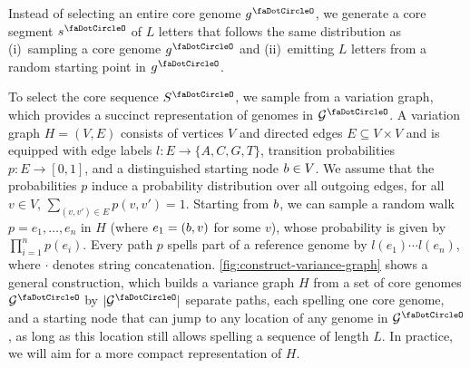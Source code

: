 Instead of selecting an entire core genome $\genome^\gcore$, we generate a core segment $\segment^\gcore$ of $L$ letters that follows the same distribution as (i)~sampling a core genome $\genome^\gcore$ and (ii)~emitting $L$ letters from a random starting point in $\genome^\gcore$.

To select the core sequence $\seq^\gcore$, we sample from a variation graph, which provides a succinct representation of genomes in $\genomes^\gcore$.
A variation graph $H=(V,E)$ consists of vertices $V$ and directed edges $E \subseteq V \times V$ and is equipped with edge labels $l \colon E \to \{A,C,G,T\}$, transition probabilities $p \colon E \to [0,1]$, and a distinguished starting node $b \in V$.
%
We assume that the probabilities $p$ induce a probability distribution over all outgoing edges, \ie for all $v \in V$, $\sum_{(v,v') \in E} p(v,v')=1$.
Starting from $b$, we can sample a random walk $p=e_1,\dots,e_n$ in $H$ (where $e_1=(b,v)$ for some $v$), whose probability is given by $\prod_{i=1}^{n} p(e_i)$.
Every path $p$ spells part of a reference genome by $l(e_1) \cdots l(e_n)$, where $\cdot$ denotes string concatenation.
%
\cref{fig:construct-variance-graph} shows a general construction, which builds a variance graph $H$ from a set of core genomes $\genomes^\gcore$ by $|\genomes^\gcore|$ separate paths, each spelling one core genome, and a starting node that can jump to any location of any genome in $\genomes^\gcore$, as long as this location still allows spelling a sequence of length $L$.
In practice, we will aim for a more compact representation of $H$. 


